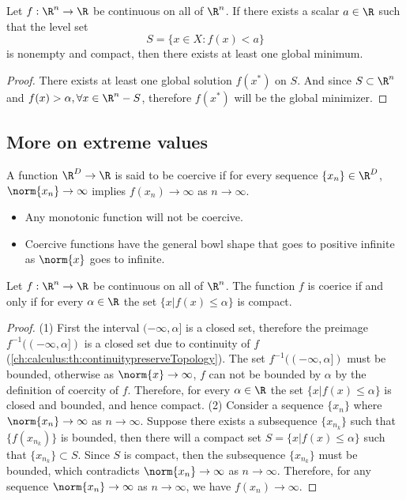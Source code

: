 \begin{refsection}
\begin{corollary}
Let $f:\R^n\to \R$ be continuous on all of $\R^n$. If there exists a scalar $a\in \R$ such that the level set
$$S=\{x\in X: f(x) <a\}$$
is nonempty and compact, then there exists at least one global minimum.
\end{corollary}
\begin{proof}
 There exists at least one global solution $f(x^*)$ on $S$. And since $S\subset \R^n$ and $f(x) > \alpha,\forall x\in \R^n-S$, therefore $f(x^*)$ will be the global minimizer. 
\end{proof}

\subsection{More on extreme values}

\begin{definition}
A function $\R^D\to \R$ is said to be coercive if for every sequence $\{x_n\} \in \R^D$, $\norm{x_n}\to \infty$ implies $f(x_n)\to \infty$ as $n\to \infty$.
\end{definition}

\begin{remark}\hfill
\begin{itemize}
	\item Any monotonic function will not be coercive.
	\item Coercive functions have the general bowl shape that goes to positive infinite as $\norm{x}$ goes to infinite.
\end{itemize}
\end{remark}

\begin{lemma}
Let $f:\R^n\to \R$ be continuous on all of $\R^n$. The function $f$ is coerice if and only if for every $\alpha \in\R$ the set $\{x|f(x)\leq \alpha\}$ is compact.
\end{lemma}
\begin{proof}
(1) First the interval $(-\infty,\alpha]$ is a closed set, therefore the preimage $f^{-1}((-\infty,\alpha])$ is a closed set due to continuity of $f$(\autoref{ch:calculus:th:continuitypreserveTopology}). The set $f^{-1}((-\infty,\alpha])$ must be bounded, otherwise as $\norm{x}\to \infty$, $f$ can not be bounded by $\alpha$ by the definition of coercity of $f$. Therefore, for every $\alpha \in\R$ the set $\{x|f(x)\leq \alpha\}$ is closed and bounded, and hence compact.
(2) Consider a sequence $\{x_n\}$ where $\norm{x_n}\to \infty$ as $n\to \infty$. Suppose there exists a subsequence $\{x_{n_k}\}$ such that $\{f(x_{n_k})\}$ is bounded, then there will a compact set $S=\{x|f(x)\leq \alpha\}$ such that $\{x_{n_k}\}\subset S$. Since $S$ is compact, then the subsequence $\{x_{n_k}\}$ must be bounded, which contradicts $\norm{x_n}\to \infty$ as $n\to \infty$. Therefore, for any sequence $\norm{x_n}\to \infty$ as $n\to \infty$, we have $f(x_n)\to \infty$.
\end{proof}



\end{refsection}
